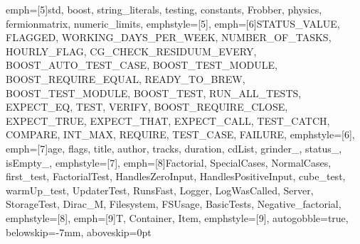 {emph=[5]{std, boost, string_literals, testing, constants, Frobber, physics, fermionmatrix, numeric_limits},
emphstyle=[5]{\color{Maroon}}, %
emph=[6]{STATUS_VALUE, FLAGGED, WORKING_DAYS_PER_WEEK, NUMBER_OF_TASKS, HOURLY_FLAG,
         CG_CHECK_RESIDUUM_EVERY, BOOST_AUTO_TEST_CASE, BOOST_TEST_MODULE, BOOST_REQUIRE_EQUAL,
         READY_TO_BREW, BOOST_TEST_MODULE, BOOST_TEST, RUN_ALL_TESTS, EXPECT_EQ, TEST, VERIFY,
         BOOST_REQUIRE_CLOSE, EXPECT_TRUE, EXPECT_THAT, EXPECT_CALL, TEST_CATCH, COMPARE, INT_MAX,
         REQUIRE, TEST_CASE, FAILURE},
emphstyle=[6]{\color{Gray}}, %
emph=[7]{age, flags, title, author, tracks, duration, cdList, grinder_, status_, isEmpty_},
emphstyle=[7]{\color{Peach!50!Purple}}, %
emph=[8]{Factorial, SpecialCases, NormalCases, first_test, FactorialTest, HandlesZeroInput,
         HandlesPositiveInput, cube_test, warmUp_test, UpdaterTest, RunsFast, Logger, LogWasCalled,
         Server, StorageTest, Dirac_M, Filesystem, FSUsage, BasicTests, Negative_factorial},
emphstyle=[8]{\color{Blue}}, %
emph=[9]{T, Container, Item},
emphstyle=[9]{\color{Crimson!70!yellow}}, %
autogobble=true, %
belowskip=-7mm,
aboveskip=0pt
}

